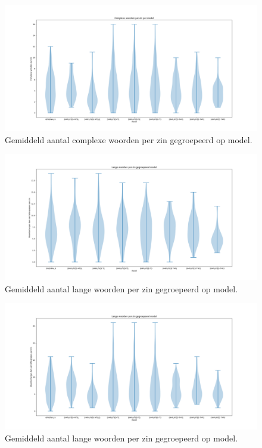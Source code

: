 \begin{figure}
	\includegraphics[width=\linewidth]{img/violinplot-complex-a2.png}
	\caption{Gemiddeld aantal complexe woorden per zin gegroepeerd op model.}
	\label{img:violinplot-complex-a2}
\end{figure}

\begin{figure}
	\includegraphics[width=\linewidth]{img/violinplot-long-a1.png}
	\caption{Gemiddeld aantal lange woorden per zin gegroepeerd op model.}
	\label{img:violinplot-long-a1}
\end{figure}

\begin{figure}
	\includegraphics[width=\linewidth]{img/violinplot-long-a2.png}
	\caption{Gemiddeld aantal lange woorden per zin gegroepeerd op model.}
	\label{img:violinplot-long-a2}
\end{figure}

